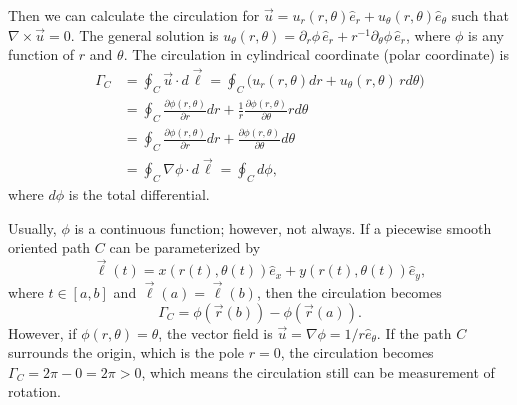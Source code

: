 \documentclass[11pt,]{beamer}
\begin{document}
\begin{frame}
	Then we can calculate the circulation for 
	$\vec{u} = u_r(r,\theta)\hat{e}_r + u_\theta(r,\theta)\hat{e}_\theta$ 
	such that $\nabla \times \vec{u}= 0$.
	The general solution is $u_\theta(r,\theta) = \partial_{r}\phi\,\hat{e}_{r} + r^{-1}\partial_\theta \phi\,\hat{e}_{r} $, where $\phi$ is any function of $r$ and $\theta$. The circulation in cylindrical coordinate (polar coordinate) is 
	\begin{align}
	\Gamma_{C} 
	&= \oint_{C}\vec{u}\cdot d\vec{\ell} = \oint_{C} \bigg(u_{r}(r,\theta)dr + u_{\theta}(r,\theta)\,rd\theta\bigg)\\
	&= \oint_{C} \frac{\partial \phi(r,\theta)}{\partial r} dr + \frac{1}{r}\frac{\partial \phi(r,\theta)}{\partial \theta} rd\theta\\
	&= \oint_{C} \frac{\partial \phi(r,\theta)}{\partial r} dr + \frac{\partial \phi(r,\theta)}{\partial \theta} d\theta\\
	&= \oint_{C} \nabla\phi\cdot d\vec{\ell} =\oint_{C}d\phi,
	\end{align}
	where $d\phi$ is the total differential.
\end{frame}
\begin{frame}
	Usually, $\phi$ is a continuous function; however, not always. 
	If a piecewise smooth oriented path $C$ can be parameterized by
	\begin{equation}
	\vec{\ell}(t) = x(r(t),\theta(t))\hat{e}_{x} + y(r(t),\theta(t))\hat{e}_{y},
	\end{equation}
	where $t\in[a,b]$ and $\vec{\ell}(a) = \vec{\ell}(b)$, then the circulation becomes
	\begin{equation}
	\Gamma_{C} = \phi(\vec{r}(b)) - \phi(\vec{r}(a)).
	\end{equation}
	However, if $\phi(r,\theta) = \theta$, 
	the vector field is $\vec{u}=\nabla\phi = 1/r \hat{e}_{\theta}$. 
	If the path $C$ surrounds the origin, which is the pole $r=0$, 
	the circulation becomes $\Gamma_C = 2\pi - 0 = 2\pi > 0$, 
	which means the circulation still can be measurement of rotation.

\end{frame}
\end{document}
